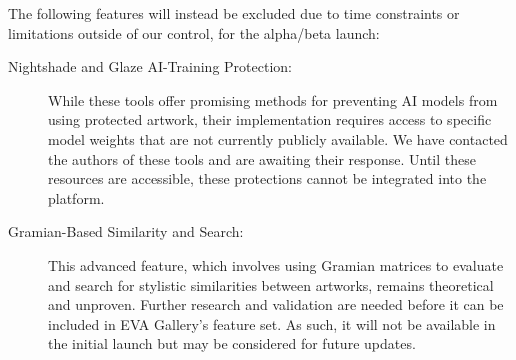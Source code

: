 \noindent
The following features will instead be excluded due to time constraints or limitations outside of our control, for the alpha/beta launch:

\begin{description}
    \item[Nightshade and Glaze AI-Training Protection:] While these tools offer promising methods for preventing AI models from using protected artwork, their implementation requires access to specific model weights that are not currently publicly available. We have contacted the authors of these tools and are awaiting their response. Until these resources are accessible, these protections cannot be integrated into the platform.
    \item[Gramian-Based Similarity and Search:] This advanced feature, which involves using Gramian matrices to evaluate and search for stylistic similarities between artworks, remains theoretical and unproven. Further research and validation are needed before it can be included in EVA Gallery's feature set. As such, it will not be available in the initial launch but may be considered for future updates.
\end{description}

\newpage
